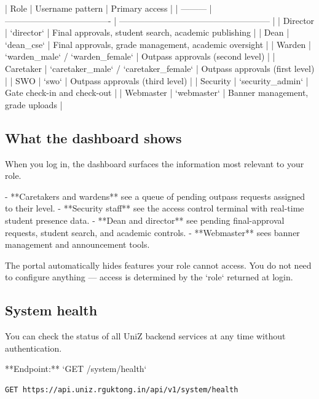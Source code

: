 | Role      | Username pattern                      | Primary access                                        |
| --------- | ------------------------------------- | ----------------------------------------------------- |
| Director  | `director`                            | Final approvals, student search, academic publishing  |
| Dean      | `dean_cse`                            | Final approvals, grade management, academic oversight |
| Warden    | `warden_male` / `warden_female`       | Outpass approvals (second level)                      |
| Caretaker | `caretaker_male` / `caretaker_female` | Outpass approvals (first level)                       |
| SWO       | `swo`                                 | Outpass approvals (third level)                       |
| Security  | `security_admin`                      | Gate check-in and check-out                           |
| Webmaster | `webmaster`                           | Banner management, grade uploads                      |

\subsection{What the dashboard shows}

When you log in, the dashboard surfaces the information most relevant to your role.

- **Caretakers and wardens** see a queue of pending outpass requests assigned to their level.
- **Security staff** see the access control terminal with real-time student presence data.
- **Dean and director** see pending final-approval requests, student search, and academic controls.
  - **Webmaster** sees banner management and announcement tools.

The portal automatically hides features your role cannot access. You do not need to configure anything — access is determined by the `role` returned at login.

\subsection{System health}

You can check the status of all UniZ backend services at any time without authentication.

**Endpoint:** `GET /system/health`

\begin{lstlisting}[language=bash]
GET https://api.uniz.rguktong.in/api/v1/system/health

\end{lstlisting}

